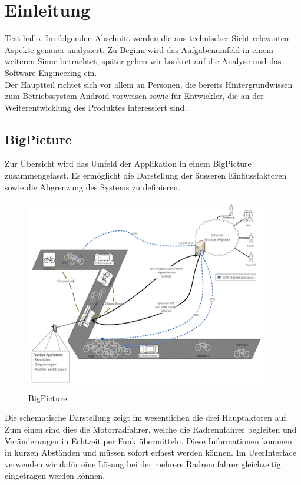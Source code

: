 \chapter{Einleitung}

Test \cite{Felker201112} hallo.
Im folgenden Abschnitt werden die aus technischer Sicht relevanten Aspekte genauer analysiert. Zu Beginn wird das Aufgabenumfeld in einem weiteren Sinne betrachtet, später gehen wir konkret auf die Analyse und das Software Engineering ein.
\\

Der Hauptteil richtet sich vor allem an Personen, die bereits Hintergrundwissen zum Betriebssystem Android vorweisen sowie für Entwickler, die an der Weiterentwicklung des Produktes interessiert sind.

\section{BigPicture}
Zur Übersicht wird das Umfeld der Applikation in einem BigPicture zusammengefasst. Es ermöglicht die Darstellung der äusseren Einflussfaktoren sowie die Abgrenzung des Systems zu definieren.

\begin{figure}[h!]
\caption{BigPicture}
\centering
\includegraphics{05technischerbericht/images/big_picture.png}
\end{figure} 

Die schematische Darstellung zeigt im wesentlichen die drei Hauptaktoren auf. Zum einen sind dies die Motorradfahrer, welche die Radrennfahrer begleiten und Veränderungen in Echtzeit per Funk übermitteln. Diese Informationen kommen in kurzen Abständen und müssen sofort erfasst werden können. Im UserInterface verwenden wir dafür eine Lösung bei der mehrere Radrennfahrer gleichzeitig eingetragen werden können.
\\

